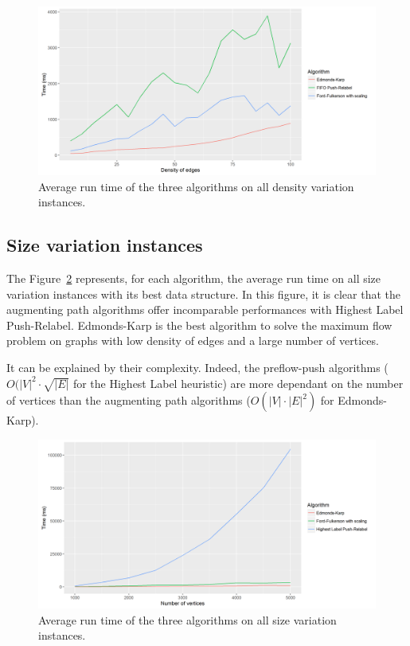 \begin{figure}[H]
\begin{center}
\includegraphics[scale=0.6]{images/meandensity.png}
\caption{Average run time of the three algorithms on all density variation instances.}
\label{fig:MeanInstances}
\end{center}
\end{figure}




\subsection{Size variation instances}
The Figure~\ref{fig:MeanInstancesize} represents, for each algorithm, the average run time on all size variation instances with its best data structure. In this figure, it is clear that the augmenting path algorithms offer incomparable performances with Highest Label Push-Relabel. Edmonds-Karp is the best algorithm to solve the maximum flow problem on graphs with low density of edges and a large number of vertices.

It can be explained by their complexity. Indeed, the preflow-push algorithms ($O(|V|^2 \cdot \sqrt{|E|}$ for the Highest Label heuristic) are more dependant on the number of vertices than the augmenting path algorithms ($O(|V| \cdot |E|^2)$ for Edmonds-Karp).

\begin{figure}[H]
\begin{center}
\includegraphics[scale=0.6]{images/meansize.png}
\caption{Average run time of the three algorithms on all size variation instances.}
\label{fig:MeanInstancesize}
\end{center}
\end{figure}




